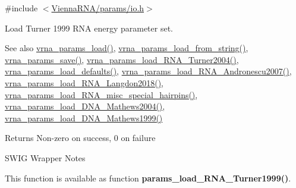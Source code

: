 {\ttfamily \#include $<$\mbox{\hyperlink{io_8h}{Vienna\+R\+N\+A/params/io.\+h}}$>$}



Load Turner 1999 R\+NA energy parameter set. 

\begin{DoxySeeAlso}{See also}
\mbox{\hyperlink{group__energy__parameters__rw_gabb0583595c67094986ef90cb4f1c7555}{vrna\+\_\+params\+\_\+load()}}, \mbox{\hyperlink{group__energy__parameters__rw_gabcd9cc7040a6b633b56b1cbd6a14d68e}{vrna\+\_\+params\+\_\+load\+\_\+from\+\_\+string()}}, \mbox{\hyperlink{group__energy__parameters__rw_ga0de3731b3e4017c52bd678549f6c4ae5}{vrna\+\_\+params\+\_\+save()}}, \mbox{\hyperlink{group__energy__parameters__rw_ga7327fe66ef60c33ba80a87c04db0ee83}{vrna\+\_\+params\+\_\+load\+\_\+\+R\+N\+A\+\_\+\+Turner2004()}}, \mbox{\hyperlink{group__energy__parameters__rw_ga413bc688695c9a707dbcc678412d6792}{vrna\+\_\+params\+\_\+load\+\_\+defaults()}}, \mbox{\hyperlink{group__energy__parameters__rw_ga511a1c17c0fd10a1fbb0936674712ff8}{vrna\+\_\+params\+\_\+load\+\_\+\+R\+N\+A\+\_\+\+Andronescu2007()}}, \mbox{\hyperlink{group__energy__parameters__rw_ga3a87fe5e73eb906c0fa26f2c42c787fd}{vrna\+\_\+params\+\_\+load\+\_\+\+R\+N\+A\+\_\+\+Langdon2018()}}, \mbox{\hyperlink{group__energy__parameters__rw_ga00e07504d66dc24aca7befb4bdaa0db1}{vrna\+\_\+params\+\_\+load\+\_\+\+R\+N\+A\+\_\+misc\+\_\+special\+\_\+hairpins()}}, \mbox{\hyperlink{group__energy__parameters__rw_gafa45b5734355baa634ca0a2e2857563e}{vrna\+\_\+params\+\_\+load\+\_\+\+D\+N\+A\+\_\+\+Mathews2004()}}, \mbox{\hyperlink{group__energy__parameters__rw_ga4d897130a700f86b7d4035a95f25615a}{vrna\+\_\+params\+\_\+load\+\_\+\+D\+N\+A\+\_\+\+Mathews1999()}}
\end{DoxySeeAlso}
\begin{DoxyReturn}{Returns}
Non-\/zero on success, 0 on failure
\end{DoxyReturn}
\begin{DoxyRefDesc}{S\+W\+I\+G Wrapper Notes}
\item[\mbox{\hyperlink{wrappers__wrappers000103}{S\+W\+I\+G Wrapper Notes}}]This function is available as function {\bfseries{params\+\_\+load\+\_\+\+R\+N\+A\+\_\+\+Turner1999()}}. \end{DoxyRefDesc}
\mbox{\label{group__energy__parameters__rw_ga511a1c17c0fd10a1fbb0936674712ff8}} 
